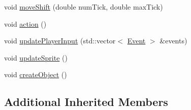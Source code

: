 \begin{DoxyCompactItemize}
\item 
void \hyperlink{classarcade_1_1_player_control_snake_a71b5d786619d7beaa6131ef3fafe0220}{move\-Shift} (double num\-Tick, double max\-Tick)
\item 
void \hyperlink{classarcade_1_1_player_control_snake_a96cfe06df5a34d3febe73f9c3ea003d6}{action} ()
\item 
void \hyperlink{classarcade_1_1_player_control_snake_a9b719f8730b1d204bff380af3bbd1b98}{update\-Player\-Input} (std\-::vector$<$ \hyperlink{structarcade_1_1_event}{Event} $>$ \&events)
\item 
void \hyperlink{classarcade_1_1_player_control_snake_aa76420cc674710fd30403f3600b47eae}{update\-Sprite} ()
\item 
void \hyperlink{classarcade_1_1_player_control_snake_a703ba3555bb19bbd17b7a8f30e302c6f}{create\-Object} ()
\end{DoxyCompactItemize}
\subsection*{Additional Inherited Members}


